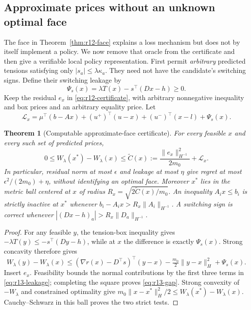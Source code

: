 \documentclass[11pt,letterpaper]{article}
\newtheorem{theorem}{Theorem}[section]
\theoremstyle{definition}
\newcommand{\1}{\mathbf 1}
\begin{document}


\subsection{Approximate prices without an unknown optimal face}\label{sec:r13-leakage}
The face in Theorem~\ref{thm:r12-face} explains a loss mechanism but does not by itself implement a policy. We now remove that oracle from the certificate and then give a verifiable local policy representation. First permit \emph{arbitrary} predicted tensions satisfying only $|s_a|\leq\lambda\kappa_a$. They need not have the candidate's switching signs. Define their switching leakage by
\[
 \Psi_s(x)=\lambda T(x)-s^\top(Dx-h)\geq0.
\]
Keep the residual $e_x$ in \eqref{eq:r12-certificate}, with arbitrary nonnegative inequality and box prices and an arbitrary equality price. Let
\begin{equation}\label{eq:r13-leakage}
 \mathcal L_x=\mu^\top(b-Ax)+(u^+)^\top(u-x)+(u^-)^\top(x-l)+\Psi_s(x).
\end{equation}
\begin{theorem}[Computable approximate-face certificate]\label{thm:r13-leakage}
For every feasible $x$ and every such set of predicted prices,
\begin{equation}\label{eq:r13-gap}
 0\leq W_\lambda(x^*)-W_\lambda(x)
 \leq\widetilde C(x):=\frac{\|e_x\|_{H^{-1}}^2}{2m_0}+\mathcal L_x.
\end{equation}
In particular, residual norm at most $\epsilon$ and leakage at most $\eta$ give regret at most $\epsilon^2/(2m_0)+\eta$, without identifying an optimal face. Moreover $x^*$ lies in the metric ball centered at $x$ of radius $R_x=\sqrt{2\widetilde C(x)/m_0}$. An inequality $A_i x\leq b_i$ is strictly inactive at $x^*$ whenever
$b_i-A_i x>R_x\|A_i\|_{H^{-1}}$. A switching sign is correct whenever
$|(Dx-h)_a|>R_x\|D_a\|_{H^{-1}}$.
\end{theorem}
\begin{proof}
For any feasible $y$, the tension-box inequality gives
$-\lambda T(y)\leq-s^\top(Dy-h)$, while at $x$ the difference is exactly $\Psi_s(x)$. Strong concavity therefore gives
\[
 W_\lambda(y)-W_\lambda(x)
 \leq(\nabla r(x)-D^\top s)^\top(y-x)
       -\tfrac{m_0}{2}\|y-x\|_H^2+\Psi_s(x).
\]
Insert $e_x$. Feasibility bounds the normal contributions by the first three terms in \eqref{eq:r13-leakage}; completing the square proves \eqref{eq:r13-gap}. Strong convexity of $-W_\lambda$ and constrained optimality give
$m_0\|x-x^*\|_H^2/2\leq W_\lambda(x^*)-W_\lambda(x)$.
Cauchy--Schwarz in this ball proves the two strict tests.
\end{proof}
\end{document}

